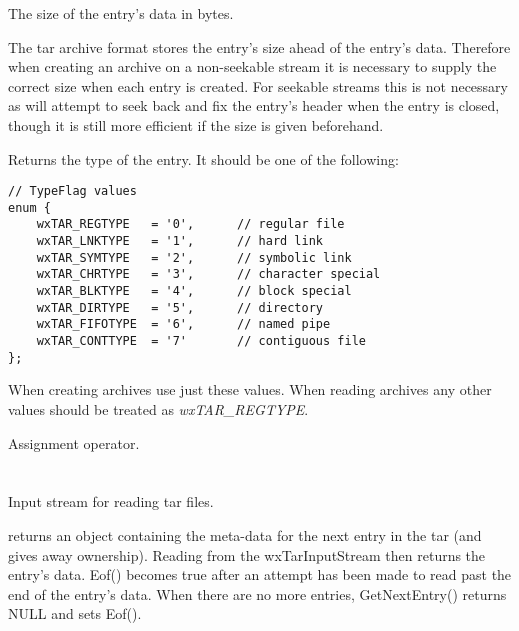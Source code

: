 The size of the entry's data in bytes.

The tar archive format stores the entry's size ahead of the entry's data.
Therefore when creating an archive on a non-seekable stream it is necessary to
supply the correct size when each entry is created. For seekable streams this
is not necessary as  will attempt
to seek back and fix the entry's header when the entry is closed, though it is
still more efficient if the size is given beforehand.


\label{wxtarentrytypeflag}



Returns the type of the entry. It should be one of the following:

\begin{verbatim}
// TypeFlag values
enum {
    wxTAR_REGTYPE   = '0',      // regular file
    wxTAR_LNKTYPE   = '1',      // hard link
    wxTAR_SYMTYPE   = '2',      // symbolic link
    wxTAR_CHRTYPE   = '3',      // character special
    wxTAR_BLKTYPE   = '4',      // block special
    wxTAR_DIRTYPE   = '5',      // directory
    wxTAR_FIFOTYPE  = '6',      // named pipe
    wxTAR_CONTTYPE  = '7'       // contiguous file
};

\end{verbatim}

When creating archives use just these values. When reading archives
any other values should be treated as {\it wxTAR\_REGTYPE}.


\label{wxtarentryoperatorassign}


Assignment operator.


%
%

\section{}\label{wxtarinputstream}

Input stream for reading tar files.

 returns an
  object containing the meta-data
for the next entry in the tar (and gives away ownership). Reading from
the wxTarInputStream then returns the entry's data. Eof() becomes true
after an attempt has been made to read past the end of the entry's data.
When there are no more entries, GetNextEntry() returns NULL and sets Eof().

